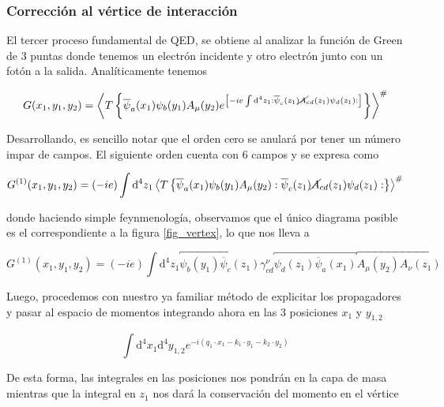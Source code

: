 \documentclass[tickz]{article}
\numberwithin{equation}{section}
\begin{document}
\subsubsection{Corrección al vértice de interacción}

El tercer proceso fundamental de QED, se obtiene al analizar la función de Green de 3 puntas donde tenemos un electrón incidente y otro electrón junto con un fotón a la salida. Analíticamente tenemos

\begin{equation}\label{qedgreenvertex}
G(x_1,y_1,y_2)=\left\langle T\left\{ \overline{\psi}_a(x_1)\psi_b(y_1)A_{\mu}(y_2)e^{\left[-ie\int \mathrm{d^4}z_{1}:\overline{\psi}_c(z_{1})\cancel{A}_{cd}(z_{1})\psi_d(z_{1}):\right]}\right\} \right\rangle ^{\#}
\end{equation}

Desarrollando, es sencillo notar que el orden cero se anulará por tener un número impar de campos. El siguiente orden cuenta con 6 campos y se expresa como

\begin{equation}\label{key}
G^{(1)}(x_1,y_1,y_2)=(-ie)\int \mathrm{d^4}z_{1} \left\langle T\left\{ \overline{\psi}_a(x_1)\psi_b(y_1)A_{\mu}(y_2) :\overline{\psi}_c(z_{1})\cancel{A}_{cd}(z_{1})\psi_d(z_{1}):\right\} \right\rangle ^{\#}
\end{equation}

donde haciendo simple feynmenología, observamos que el único diagrama posible es el correspondiente a la figura \ref{fig_vertex}, lo que nos lleva a

\begin{equation}\label{key}
G^{(1)}(x_1,y_1,y_2)=(-ie)\int \mathrm{d^4}z_{1} \overbracket{\psi_b(y_1)\overline{\psi}_c(z_{1})} \gamma^{\nu}_{cd} \overbracket{\psi_d(z_{1})\overline{\psi}_a(x_1)}  \overbracket{A_{\mu}(y_2) A_{\nu}(z_1)}
\end{equation}

Luego, procedemos con nuestro ya familiar método de explicitar los propagadores y pasar al espacio de momentos integrando ahora en las 3 posiciones $ x_1 $ y $ y_{1,2} $

\begin{equation}\label{expfourier}
\int\mathrm{d^4}x_1\mathrm{d^4}y_{1,2} e^{-i\left(q_1 \cdot x_1 - k_1 \cdot y_1 - k_2 \cdot y_2\right)}
\end{equation}

De esta forma, las integrales en las posiciones nos pondrán en la capa de masa mientras que la integral en $ z_1 $ nos dará la conservación del momento en el vértice
\end{document}
